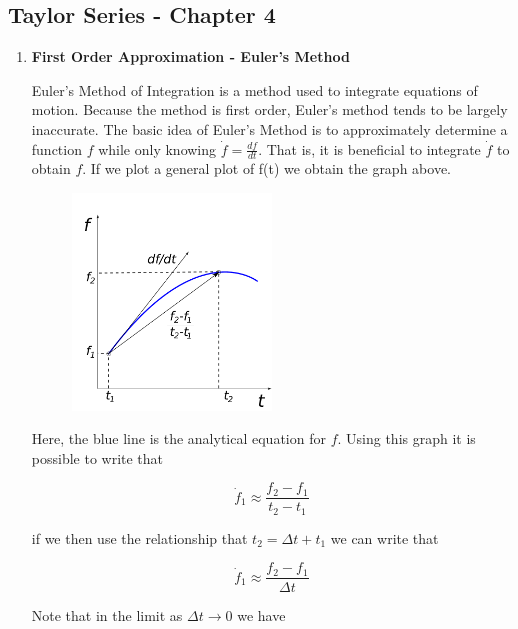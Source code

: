 \subsection{Taylor Series - Chapter 4}

\begin{enumerate}

\item {\bf First Order Approximation - Euler's Method}

Euler's Method of Integration is a method used to integrate
equations of motion. Because the method is first order, Euler's
method tends to be largely inaccurate. The basic idea of Euler's
Method is to approximately determine a function $f$ while only
knowing $\dot{f}=\frac{df}{dt}$. That is, it is beneficial to integrate
$\dot{f}$ to obtain $f$. If we plot a general plot of f(t) we
obtain the graph above.
\begin{figure}[H]
  \begin{center}
    \includegraphics[height=0.5\textwidth,width=0.5\textwidth]{Graphics/Eulers_Method.pdf}
  \end{center}
\end{figure}
Here, the blue line is the analytical equation for $f$. Using this
graph it is possible to write that

\begin{equation}
  \dot{f}_1 \approx \frac{f_2-f_1}{t_2-t_1}
\end{equation}

if we then use the relationship that $t_2 = \Delta t + t_1$ we can
write that 

\begin{equation}
  \dot{f}_1 \approx \frac{f_2-f_1}{\Delta t}
\end{equation}

Note that in the limit as $\Delta t \rightarrow 0$ we have


\end{enumerate}
